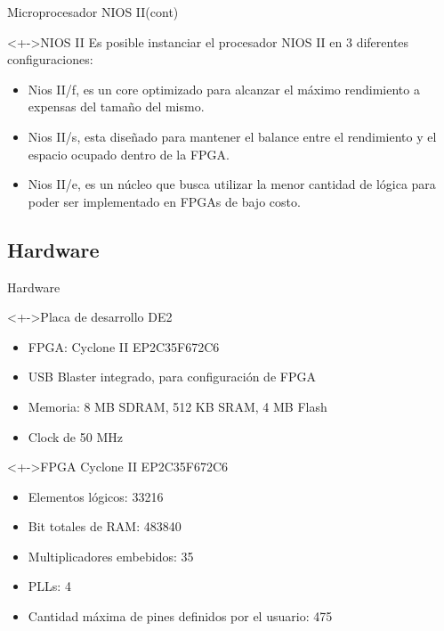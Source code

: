 \documentclass[xcolor=dvipsnames]{beamer}
\begin{document}
\begin{frame}{Microprocesador NIOS II(cont)}
\center
   \begin{block}<+->{NIOS II}
	Es posible instanciar el procesador NIOS II en 3 diferentes configuraciones:	
	

    \begin{itemize}
	\scriptsize
     	\item Nios II/f, es un core optimizado para alcanzar el máximo rendimiento a expensas del tamaño del mismo.
	\item Nios II/s, esta diseñado para mantener el balance entre el rendimiento y el espacio ocupado dentro de la FPGA.
	\item Nios II/e, es un núcleo que busca utilizar la menor cantidad de lógica para poder ser implementado en FPGAs de bajo costo.
    \end{itemize}
  \end{block}
\end{frame}

\subsection{Hardware}
\begin{frame}{Hardware}
  \begin{block}<+->{Placa de desarrollo DE2} 	
    \begin{itemize}
      \scriptsize
     	\item FPGA: Cyclone II EP2C35F672C6
	\item USB Blaster integrado, para configuración de FPGA
	\item Memoria: 8 MB SDRAM, 512 KB SRAM, 4 MB Flash
	\item Clock de 50 MHz
     \end{itemize}
  \end{block}

  \begin{block}<+->{FPGA Cyclone II EP2C35F672C6} 	
    \begin{itemize}
      \scriptsize
     	\item Elementos lógicos: 33216
	\item Bit totales de RAM: 483840
	\item Multiplicadores embebidos: 35
	\item PLLs: 4
	\item Cantidad máxima de pines definidos por el usuario: 475
     \end{itemize}
  \end{block}
\end{frame}
\end{document}
